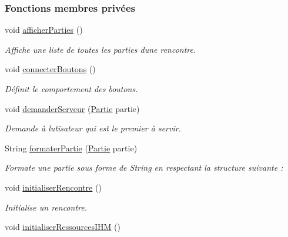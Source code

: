 \subsubsection*{Fonctions membres privées}
\begin{DoxyCompactItemize}
\item 
void \hyperlink{classcom_1_1example_1_1area_1_1_i_h_m_gestion_rencontre_a5d86e4705a4bbea19f05781403df4742}{afficher\+Parties} ()
\begin{DoxyCompactList}\small\item\em Affiche une liste de toutes les parties d\textquotesingle{}une rencontre. \end{DoxyCompactList}\item 
void \hyperlink{classcom_1_1example_1_1area_1_1_i_h_m_gestion_rencontre_a3d4decb257b09dafa98f4a6accc8c15d}{connecter\+Boutons} ()
\begin{DoxyCompactList}\small\item\em Définit le comportement des boutons. \end{DoxyCompactList}\item 
void \hyperlink{classcom_1_1example_1_1area_1_1_i_h_m_gestion_rencontre_a34d405f3c30f6d040b2db3a6ee54a2f4}{demander\+Serveur} (\hyperlink{classcom_1_1example_1_1area_1_1_partie}{Partie} partie)
\begin{DoxyCompactList}\small\item\em Demande à l\textquotesingle{}utisateur qui est le premier à servir. \end{DoxyCompactList}\item 
String \hyperlink{classcom_1_1example_1_1area_1_1_i_h_m_gestion_rencontre_aadc556a63bb77b707f4677c34d61dae5}{formater\+Partie} (\hyperlink{classcom_1_1example_1_1area_1_1_partie}{Partie} partie)
\begin{DoxyCompactList}\small\item\em Formate une partie sous forme de String en respectant la structure suivante \+: \end{DoxyCompactList}\item 
void \hyperlink{classcom_1_1example_1_1area_1_1_i_h_m_gestion_rencontre_aedaadbb550aab497aac0501ced04a3eb}{initialiser\+Rencontre} ()
\begin{DoxyCompactList}\small\item\em Initialise un rencontre. \end{DoxyCompactList}\item 
void \hyperlink{classcom_1_1example_1_1area_1_1_i_h_m_gestion_rencontre_a18b1c1a04b6070a8d90aa135ad1212b7}{initialiser\+Ressources\+I\+HM} ()

\end{DoxyCompactItemize}
